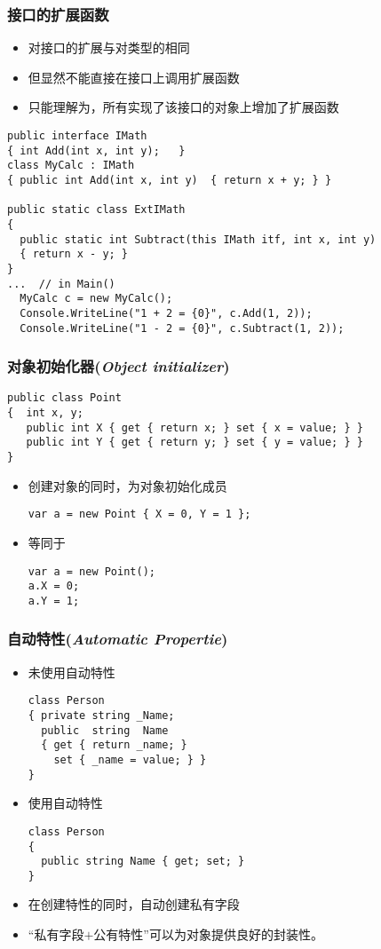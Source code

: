 \begin{frame}[fragile]
\frametitle{接口的扩展函数}
\begin{itemize}
\item 对接口的扩展与对类型的相同
\item 但显然不能直接在接口上调用扩展函数
\item 只能理解为，所有实现了该接口的对象上增加了扩展函数
\end{itemize}
\begin{lstlisting}
public interface IMath
{ int Add(int x, int y);   }
class MyCalc : IMath
{ public int Add(int x, int y)  { return x + y; } }

public static class ExtIMath
{
  public static int Subtract(this IMath itf, int x, int y)
  { return x - y; }
}
...  // in Main()
  MyCalc c = new MyCalc();
  Console.WriteLine("1 + 2 = {0}", c.Add(1, 2));
  Console.WriteLine("1 - 2 = {0}", c.Subtract(1, 2));
\end{lstlisting}
\end{frame}

\begin{frame}[fragile]
\frametitle{对象初始化器(\textit{Object initializer})}
\begin{lstlisting}
public class Point
{  int x, y;
   public int X { get { return x; } set { x = value; } }
   public int Y { get { return y; } set { y = value; } }
}
\end{lstlisting}
\begin{itemize}
\item 创建对象的同时，为对象初始化成员
\begin{lstlisting}
var a = new Point { X = 0, Y = 1 };
\end{lstlisting}
\item 等同于
\begin{lstlisting}
var a = new Point();
a.X = 0;
a.Y = 1;
\end{lstlisting}
\end{itemize}
\end{frame}

\begin{frame}[fragile]
\frametitle{自动特性(\textit{Automatic Propertie})}
\begin{itemize}
\item 未使用自动特性
\begin{lstlisting}
class Person
{ private string _Name;
  public  string  Name
  { get { return _name; }
    set { _name = value; } }
}
\end{lstlisting}
\item 使用自动特性
\begin{lstlisting}
class Person
{
  public string Name { get; set; }
}
\end{lstlisting}
\item 在创建特性的同时，自动创建私有字段
\item “私有字段$+$公有特性”可以为对象提供良好的封装性。
\end{itemize}
\end{frame}

